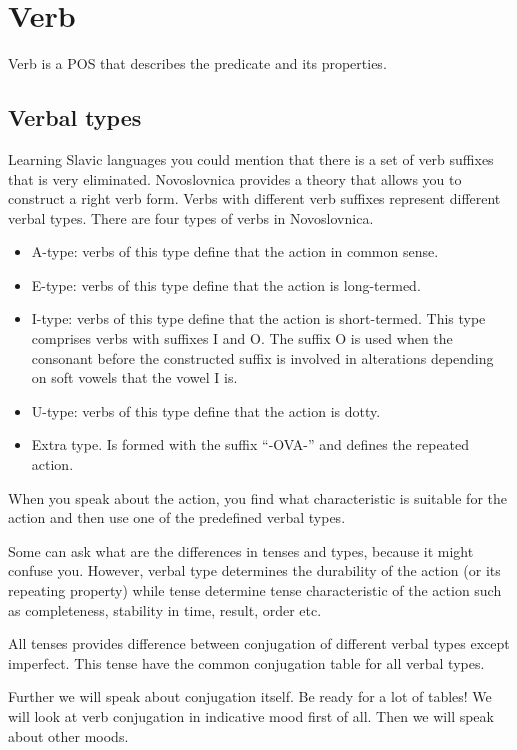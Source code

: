 \section{Verb}

Verb is a POS that describes the predicate and its properties. 


\subsection{Verbal types}

Learning Slavic languages you could mention that there is a set of verb suffixes that is very eliminated. Novoslovnica provides a theory that allows you to construct a right verb form.
Verbs with different verb suffixes represent different verbal types. There are four types of verbs in Novoslovnica.

\begin{itemize}
	\item A-type: verbs of this type define that the action in common sense.  
	\item E-type: verbs of this type define that the action is long-termed.
	\item I-type: verbs of this type define that the action is short-termed. This type comprises verbs with suffixes I and O. The suffix O is used when the consonant before the constructed suffix is involved in alterations depending on soft vowels that the vowel I is.
	\item U-type: verbs of this type define that the action is dotty.
	\item Extra type. Is formed with the suffix “-OVA-” and defines the repeated action.  
\end{itemize}

When you speak about the action, you find what characteristic is suitable for the action and then use one of the predefined verbal types.

Some can ask what are the differences in tenses and types, because it might confuse you. However, verbal type determines the durability of the action (or its repeating property) while tense determine tense characteristic of the action such as completeness, stability in time, result, order etc.

All tenses provides difference between conjugation of different verbal types except imperfect. This tense have the common conjugation table for all verbal types. 

Further we will speak about conjugation itself. Be ready for a lot of tables! We will look at verb conjugation in indicative mood first of all. Then we will speak about other moods.

